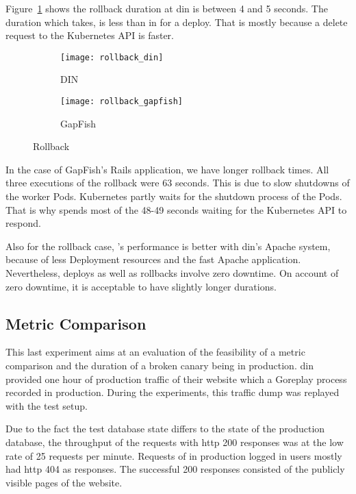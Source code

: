 Figure~\ref{fig:rollback_din} shows the rollback duration at \gls{din}
is between 4 and 5 seconds. The duration which \deployer takes, is less than in for a deploy.
That is mostly because a delete request to the Kubernetes API is faster.

\begin{figure}[htbp]
  \centering
  \begin{subfigure}{.5\textwidth}
    \texttt{[image: rollback\_din]}
    \caption{DIN}
    \label{fig:rollback_din}
  \end{subfigure}%
  \begin{subfigure}{.5\textwidth}
    \texttt{[image: rollback\_gapfish]}
    \caption{GapFish}
    \label{fig:rollback_gapfish}
  \end{subfigure}
  \caption{Rollback}
\end{figure}

In the case of GapFish's Rails application, we have longer rollback times. All three
executions of the rollback were 63 seconds. This is due to slow shutdowns of the worker
Pods. Kubernetes partly waits for the shutdown process of the Pods. That is why
\deployer spends most of the 48-49 seconds waiting for the Kubernetes API to respond.

Also for the rollback case, \deployer's performance is better with \gls{din}'s Apache system,
because of less Deployment resources and the fast Apache application. Nevertheless,
deploys as well as rollbacks involve zero downtime. On account of zero downtime, it is acceptable to have slightly longer durations.

\subsection{Metric Comparison}
\label{sec:eval_metrics}

This last experiment aims at an evaluation of the feasibility
of a metric comparison and the duration of a broken canary being in production. \gls{din}
provided one hour of production traffic of their website which a Goreplay process
recorded in production. During the experiments, this traffic dump was replayed with the test setup.

Due to the fact the test database state differs to the state of the production database, the
throughput of the requests with http 200 responses was at the low rate of 25 requests per
minute. Requests of in production logged in users mostly had http 404 as responses. The
successful 200 responses consisted of the publicly visible pages of the website.

